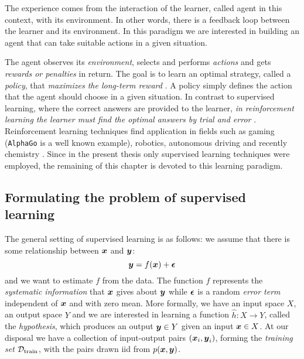 \begin{definition}
	The experience comes from the interaction of the learner, called
	agent in this context, with its environment. In other words,
	there is a feedback loop between the learner and its environment. In this
	paradigm we are interested in building an agent that can take suitable
	actions in a given situation.
\end{definition}

The agent observes its \emph{environment}, selects and performs \emph{actions}
and gets \emph{rewards or penalties} in return. The goal is to learn an optimal
strategy, called a \emph{policy}, that \emph{maximizes the long-term reward}
\parencite{sklearn}. A policy simply defines the action that the agent should
choose in a given situation. In contrast to supervised learning, where the
correct answers are provided to the learner, \emph{in reinforcement learning the
learner must find the optimal answers by trial and error}
\parencite{bishop2007}. Reinforcement learning techniques find application in
fields such as gaming (\texttt{AlphaGo} is a well known example), robotics,
autonomous driving and recently chemistry \parencite{li, Gow2022}. Since in the
present thesis only supervised learning techniques were employed, the remaining
of this chapter is devoted to this learning paradigm.

\subsection{Formulating the problem of supervised learning}

The general setting of supervised learning is as follows: we assume that there
is some relationship between $\boldsymbol{x}$ and $\boldsymbol{y}$:
\begin{equation}
	\label{eq:supervised}
	\boldsymbol{y} = f(\boldsymbol{x}) + \boldsymbol{\epsilon}
\end{equation}
and we want to estimate $f$ from the data. The function $f$ represents the
\emph{systematic information} that $\boldsymbol{x}$ gives about $\boldsymbol{y}$ while
$\boldsymbol{\epsilon}$ is a random \emph{error term} independent of
$\boldsymbol{x}$ and with zero mean. More formally, we have an input space $X$, an output
space $Y$ and we are interested in learning a function $\hat{h} \colon X \to Y$,
called the \emph{hypothesis}, which produces an output $\boldsymbol{y}
\in Y$ given an input $\boldsymbol{x} \in X$. At our disposal we have a collection of
input-output pairs $(\boldsymbol{x}_i, \boldsymbol{y}_i)$, forming the \emph{training set}
$\mathcal{D}_\text{train}$, with the pairs drawn \acrshort{iid} from $p(\boldsymbol{x}, \boldsymbol{y})$.

